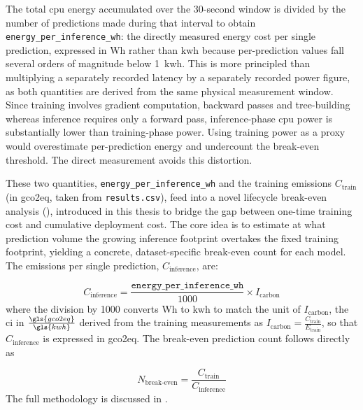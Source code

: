 The total \gls{cpu} energy accumulated over the 30-second window is divided by the number of predictions made during that interval to obtain \texttt{energy\_per\_inference\_wh}: the directly measured energy cost per single prediction, expressed in Wh rather than \gls{kwh} because per-prediction values fall several orders of magnitude below 1~\gls{kwh}. This is more principled than multiplying a separately recorded latency by a separately recorded power figure, as both quantities are derived from the same physical measurement window. Since training involves gradient computation, backward passes and tree-building whereas inference requires only a forward pass, inference-phase \gls{cpu} power is substantially lower than training-phase power. Using training power as a proxy would overestimate per-prediction energy and undercount the break-even threshold. The direct measurement avoids this distortion.

These two quantities, \texttt{energy\_per\_inference\_wh} and the training emissions $C_{\text{train}}$ (in \gls{gco2eq}, taken from \texttt{results.csv}), feed into a novel lifecycle break-even analysis (), introduced in this thesis to bridge the gap between one-time training cost and cumulative deployment cost. The core idea is to estimate at what prediction volume the growing inference footprint overtakes the fixed training footprint, yielding a concrete, dataset-specific break-even count for each model. The emissions per single prediction, $C_{\text{inference}}$, are:

\begin{equation}
C_{\text{inference}} = \frac{\texttt{energy\_per\_inference\_wh}}{1000} \times I_{\text{carbon}}
\label{eq:co2_per_inference}
\end{equation}
where the division by 1000 converts Wh to \gls{kwh} to match the unit of $I_{\text{carbon}}$, the \gls{ci} in $\frac{\gls{gco2eq}}{\gls{kwh}}$ derived from the training measurements as $I_{\text{carbon}} = \frac{C_{\text{train}}}{E_{\text{train}}}$, so that $C_{\text{inference}}$ is expressed in \gls{gco2eq}.
The break-even prediction count follows directly as

\begin{equation}
  \label{eq:N_Breakeven}
  N_{\text{break-even}} = \frac{C_{\text{train}}}{C_{\text{inference}}}
\end{equation}
The full methodology is discussed in .

